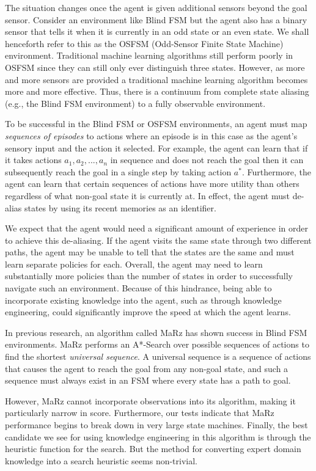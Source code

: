 \documentclass[letterpaper]{article} %
\begin{document}
The situation changes once the agent is given additional sensors
beyond the goal sensor.  Consider an environment like Blind FSM but
the agent also has a binary sensor that tells it when it is currently
in an odd state or an even state.  We shall henceforth refer to this
as the OSFSM (Odd-Sensor Finite State Machine) environment. Traditional machine learning algorithms still perform poorly in OSFSM since they can still only ever distinguish three
states.  However, as more and more sensors are provided a traditional
machine learning algorithm becomes more and more effective.  Thus,
there is a continuum from complete state aliasing (e.g., the Blind FSM
environment) to a fully observable environment.

To be successful in the Blind FSM or OSFSM environments, an agent must map
\textit{sequences of episodes} to actions where an episode is in this
case as the agent's sensory input and the action it selected.  For
example, the agent can learn that if it takes actions $a_1, a_2, ..., a_n$
in sequence and does not reach the goal then it can subsequently
reach the goal in a single step by taking action $a^*$.  Furthermore,
the agent can learn that certain sequences of actions have more
utility than others regardless of what non-goal state it is currently
at. In effect, the agent must de-alias states by using its recent memories as an identifier.

We expect that the agent would need a significant amount of experience in order to achieve this de-aliasing. If the agent visits the same state through two different paths, the agent may be unable to tell that the states are the same and must learn separate policies for each. Overall, the agent may need to learn substantially more policies than the number of states in order to successfully navigate such an environment. Because of this hindrance, being able to incorporate existing knowledge into the agent, such as through knowledge engineering, could significantly improve the speed at which the agent learns.

In previous research, an algorithm called MaRz \cite{Rodriguez17} has
shown success in Blind FSM environments.  MaRz performs an
A*-Search \cite{Russell09}over possible sequences of actions to find
the shortest \textit{universal sequence}.  A universal sequence is a
sequence of actions that causes the agent to reach the goal from any
non-goal state, and such a sequence must always exist in an FSM where every state has a path to goal.

However, MaRz cannot incorporate observations into its algorithm, making it particularly narrow in score. Furthermore, our tests indicate that MaRz performance begins to break down in very large state machines. Finally, the best candidate we see for using knowledge engineering in this algorithm is through the heuristic function for the search. But the method for converting expert domain knowledge into a search heuristic seems non-trivial.
\end{document}
